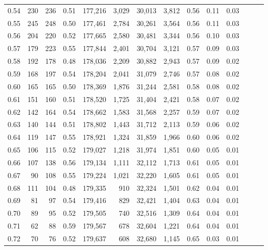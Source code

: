 \begin{tabular}{rrrrrrrrrrrrrr}
0.54 &     230 &  236 &  0.51 &  177,216 &    3,029 &  30,013 &   3,812 &  0.56 &  0.11 &      0.03 \\
0.55 &     245 &  248 &  0.50 &  177,461 &    2,784 &  30,261 &   3,564 &  0.56 &  0.11 &      0.03 \\
0.56 &     204 &  220 &  0.52 &  177,665 &    2,580 &  30,481 &   3,344 &  0.56 &  0.10 &      0.03 \\
0.57 &     179 &  223 &  0.55 &  177,844 &    2,401 &  30,704 &   3,121 &  0.57 &  0.09 &      0.03 \\
0.58 &     192 &  178 &  0.48 &  178,036 &    2,209 &  30,882 &   2,943 &  0.57 &  0.09 &      0.02 \\
0.59 &     168 &  197 &  0.54 &  178,204 &    2,041 &  31,079 &   2,746 &  0.57 &  0.08 &      0.02 \\
0.60 &     165 &  165 &  0.50 &  178,369 &    1,876 &  31,244 &   2,581 &  0.58 &  0.08 &      0.02 \\
0.61 &     151 &  160 &  0.51 &  178,520 &    1,725 &  31,404 &   2,421 &  0.58 &  0.07 &      0.02 \\
0.62 &     142 &  164 &  0.54 &  178,662 &    1,583 &  31,568 &   2,257 &  0.59 &  0.07 &      0.02 \\
0.63 &     140 &  144 &  0.51 &  178,802 &    1,443 &  31,712 &   2,113 &  0.59 &  0.06 &      0.02 \\
0.64 &     119 &  147 &  0.55 &  178,921 &    1,324 &  31,859 &   1,966 &  0.60 &  0.06 &      0.02 \\
0.65 &     106 &  115 &  0.52 &  179,027 &    1,218 &  31,974 &   1,851 &  0.60 &  0.05 &      0.01 \\
0.66 &     107 &  138 &  0.56 &  179,134 &    1,111 &  32,112 &   1,713 &  0.61 &  0.05 &      0.01 \\
0.67 &      90 &  108 &  0.55 &  179,224 &    1,021 &  32,220 &   1,605 &  0.61 &  0.05 &      0.01 \\
0.68 &     111 &  104 &  0.48 &  179,335 &      910 &  32,324 &   1,501 &  0.62 &  0.04 &      0.01 \\
0.69 &      81 &   97 &  0.54 &  179,416 &      829 &  32,421 &   1,404 &  0.63 &  0.04 &      0.01 \\
0.70 &      89 &   95 &  0.52 &  179,505 &      740 &  32,516 &   1,309 &  0.64 &  0.04 &      0.01 \\
0.71 &      62 &   88 &  0.59 &  179,567 &      678 &  32,604 &   1,221 &  0.64 &  0.04 &      0.01 \\
0.72 &      70 &   76 &  0.52 &  179,637 &      608 &  32,680 &   1,145 &  0.65 &  0.03 &      0.01 \\

\end{tabular}
